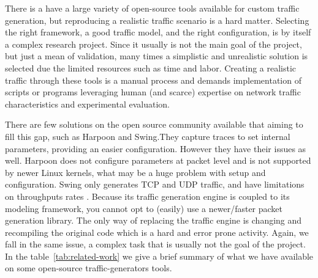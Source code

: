 There is a  have a large variety of open-source tools available for custom traffic generation, but reproducing a realistic traffic scenario is a hard matter. Selecting the right framework, a good traffic model, and the right configuration, is by itself a complex research project\cite{legotg-paper}\cite{selfsimilar-ethernet}. Since it usually is not the main goal of the project, but just a mean of validation, many times a simplistic and unrealistic solution is selected due the limited resources such as time and labor.  Creating a realistic traffic through these tools is a manual process and demands implementation of scripts or programs leveraging human (and scarce) expertise on network traffic characteristics  and experimental evaluation. 


There are few solutions on the open source community available that aiming to fill this gap, such as Harpoon\cite{harpoon-paper} and Swing\cite{swing-paper}.They capture traces to set internal parameters, providing an easier configuration. However they have their issues as well. Harpoon does not configure parameters at packet level\cite{harpoon-paper} and is not supported by newer Linux kernels, what may be a huge problem with setup and configuration. Swing\cite{swing-paper} only generates TCP and UDP traffic, and have limitations on throughputs rates\cite{swing-paper} \cite{legotg-paper}. Because its traffic generation engine is coupled to its modeling framework, you cannot opt to (easily) use a newer/faster packet generation library. The only way of replacing the traffic engine is changing and recompiling the original code which is a hard and  error prone activity\cite{legotg-paper}. Again, we fall in the same issue, a complex task that is usually not the goal of the project. In the table~\ref{tab:related-work} we give a brief summary of what we have available on some open-source traffic-generators tools. 




